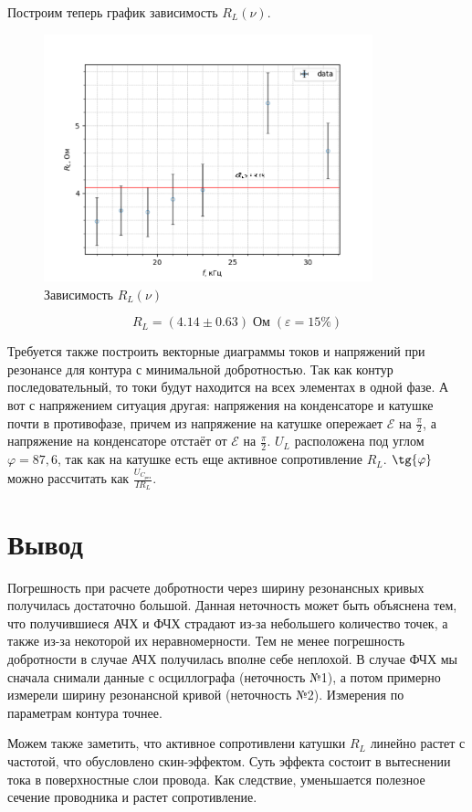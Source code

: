 \documentclass[a4paper, 12pt]{article}
\begin{document}
Построим теперь график зависимость $R_L(\nu)$.

\begin{figure}[H]
    \centering
    \includegraphics[width = 0.85\textwidth]{R_L-f_0/graphs/marked.pdf}
    \caption{Зависимость $R_L(\nu)$}
\end{figure}


\begin{equation}
    R_L = (4.14 \pm 0.63) \; \text{Ом} \; (\varepsilon = 15 \%)
\end{equation}

Требуется также построить векторные диаграммы токов и напряжений при резонансе для контура с минимальной добротностью. Так как контур последовательный, то токи будут находится на всех элементах в одной фазе. А вот с напряжением ситуация другая: напряжения на конденсаторе и катушке почти в противофазе, причем из напряжение на катушке опережает $\mathcal{E}$ на $\frac{\pi}{2}$, а напряжение на конденсаторе отстаёт от $\mathcal{E}$ на $\frac{\pi}{2}$.
	$U_L$ расположена под углом $\varphi = 87,6$\textdegree, так как на катушке есть еще активное сопротивление $R_L$. $\tg{\varphi}$ можно рассчитать как $\frac{U_{C_{\text{рез}}}}{IR_L}$.

\section*{Вывод}

Погрешность при расчете добротности через ширину резонансных кривых получилась достаточно большой. Данная неточность может быть объяснена тем, что получившиеся АЧХ и ФЧХ страдают из-за небольшего количество точек, а также из-за некоторой их неравномерности. Тем не менее погрешность добротности в случае АЧХ получилась вполне себе неплохой. В случае ФЧХ мы сначала снимали данные с осциллографа (неточность №1), а потом примерно измерели ширину резонансной кривой (неточность №2). Измерения по параметрам контура точнее.

Можем также заметить, что активное сопротивлени катушки $R_L$ линейно растет с частотой, что обусловлено скин-эффектом. Суть эффекта состоит в вытеснении тока в поверхностные слои провода. Как следствие, уменьшается полезное сечение проводника и растет сопротивление.
\end{document}
